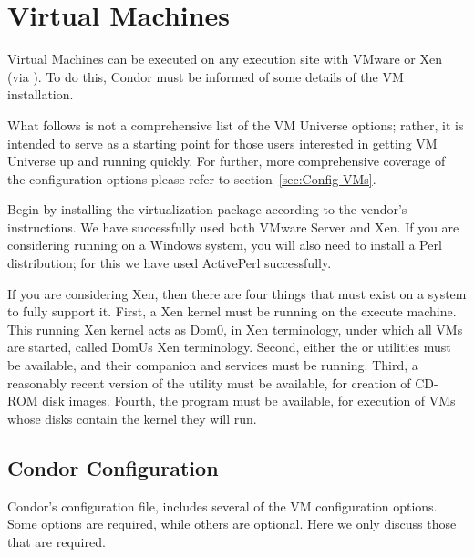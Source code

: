 \section{\label{sec:vm-install}Virtual Machines}


Virtual Machines can be executed on any execution site with VMware or Xen
(via ).  To do this, Condor must be informed of some details 
of the VM installation.

What follows is not a comprehensive list of the VM Universe options; rather,
it is intended to serve as a starting point for those users interested in
getting VM Universe up and running quickly.  For further, more comprehensive 
coverage of the configuration options please refer to 
section~\ref{sec:Config-VMs}.

Begin by installing the virtualization package according to the vendor's
instructions.  We have successfully used both VMware Server and Xen. If you
are considering running on a Windows system, you will also need to install
a Perl distribution; for this we have used ActivePerl successfully. 

If you are considering Xen, then there are four things that must exist on 
a system to fully support it. First, a Xen kernel must be running on the 
execute machine. This running Xen kernel acts as Dom0, in Xen terminology, 
under which all VMs are started, called DomUs Xen terminology. Second, 
either the  or  utilities must be available, and their 
companion  and  services must be running. Third, a 
reasonably recent version of the  utility must be available, 
for creation of CD-ROM disk images. Fourth, the  program must be 
available, for execution of VMs whose disks contain the kernel they will run.

\subsection{Condor Configuration}

Condor's configuration file, includes several of the 
VM configuration options.  Some options are required, while others are 
optional.  Here we only discuss those that are required.


